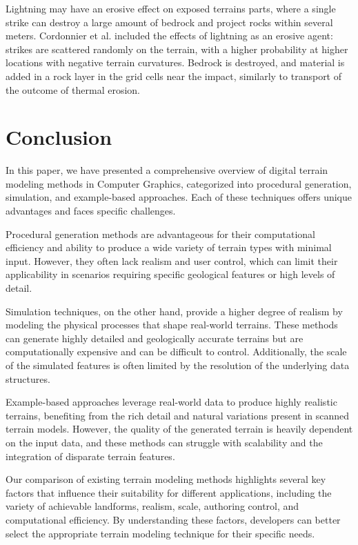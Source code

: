 \documentclass{article}
\begin{document}
Lightning may have an erosive effect on exposed terrains parts, where a single strike can destroy a large amount of bedrock and project rocks within several meters. Cordonnier et al. \cite{CGG17} included the effects of lightning as an erosive agent: strikes are scattered randomly on the terrain, with a higher probability at higher locations with negative terrain curvatures. Bedrock is destroyed, and material is added in a rock layer in the grid cells near the impact, similarly to transport of the outcome of thermal erosion.


\section{Conclusion}

In this paper, we have presented a comprehensive overview of digital terrain modeling methods in Computer Graphics, categorized into procedural generation, simulation, and example-based approaches. Each of these techniques offers unique advantages and faces specific challenges.

Procedural generation methods are advantageous for their computational efficiency and ability to produce a wide variety of terrain types with minimal input. However, they often lack realism and user control, which can limit their applicability in scenarios requiring specific geological features or high levels of detail.

Simulation techniques, on the other hand, provide a higher degree of realism by modeling the physical processes that shape real-world terrains. These methods can generate highly detailed and geologically accurate terrains but are computationally expensive and can be difficult to control. Additionally, the scale of the simulated features is often limited by the resolution of the underlying data structures.

Example-based approaches leverage real-world data to produce highly realistic terrains, benefiting from the rich detail and natural variations present in scanned terrain models. However, the quality of the generated terrain is heavily dependent on the input data, and these methods can struggle with scalability and the integration of disparate terrain features.

Our comparison of existing terrain modeling methods highlights several key factors that influence their suitability for different applications, including the variety of achievable landforms, realism, scale, authoring control, and computational efficiency. By understanding these factors, developers can better select the appropriate terrain modeling technique for their specific needs.
\end{document}
